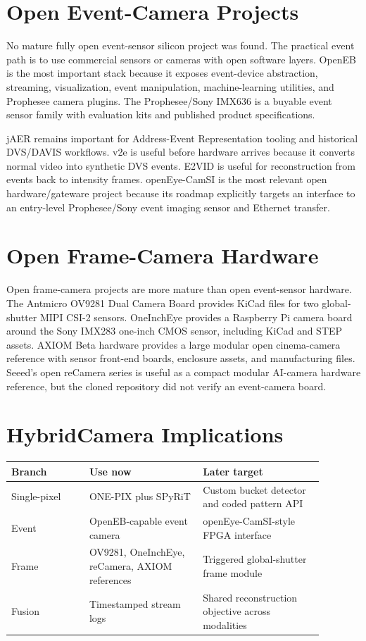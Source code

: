 \documentclass[11pt]{article}
\begin{document}
\section{Open Event-Camera Projects}

No mature fully open event-sensor silicon project was found. The practical event
path is to use commercial sensors or cameras with open software layers. OpenEB
is the most important stack because it exposes event-device abstraction,
streaming, visualization, event manipulation, machine-learning utilities, and
Prophesee camera plugins. The Prophesee/Sony IMX636 is a buyable event sensor
family with evaluation kits and published product specifications.

jAER remains important for Address-Event Representation tooling and historical
DVS/DAVIS workflows. v2e is useful before hardware arrives because it converts
normal video into synthetic DVS events. E2VID is useful for reconstruction from
events back to intensity frames. openEye-CamSI is the most relevant open
hardware/gateware project because its roadmap explicitly targets an interface to
an entry-level Prophesee/Sony event imaging sensor and Ethernet transfer.

\section{Open Frame-Camera Hardware}

Open frame-camera projects are more mature than open event-sensor hardware. The
Antmicro OV9281 Dual Camera Board provides KiCad files for two global-shutter
MIPI CSI-2 sensors. OneInchEye provides a Raspberry Pi camera board around the
Sony IMX283 one-inch CMOS sensor, including KiCad and STEP assets. AXIOM Beta
hardware provides a large modular open cinema-camera reference with sensor
front-end boards, enclosure assets, and manufacturing files. Seeed's open
reCamera series is useful as a compact modular AI-camera hardware reference, but
the cloned repository did not verify an event-camera board.

\section{HybridCamera Implications}

\begin{table}[h]
\centering
\small
\begin{tabular}{p{0.22\linewidth}p{0.32\linewidth}p{0.34\linewidth}}
\toprule
Branch & Use now & Later target \\
\midrule
Single-pixel & ONE-PIX plus SPyRiT & Custom bucket detector and coded pattern API \\
Event & OpenEB-capable event camera & openEye-CamSI-style FPGA interface \\
Frame & OV9281, OneInchEye, reCamera, AXIOM references & Triggered global-shutter frame module \\
Fusion & Timestamped stream logs & Shared reconstruction objective across modalities \\
\bottomrule
\end{tabular}
\end{table}
\end{document}

